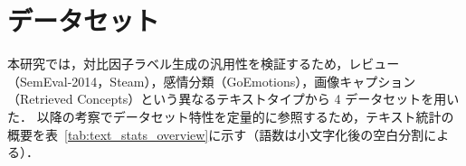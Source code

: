 \section{データセット}
\label{sec:dataset}

本研究では，対比因子ラベル生成の汎用性を検証するため，レビュー（SemEval-2014，Steam），感情分類（GoEmotions），画像キャプション（Retrieved Concepts）という異なるテキストタイプから 4 データセットを用いた．
以降の考察でデータセット特性を定量的に参照するため，テキスト統計の概要を表~\ref{tab:text_stats_overview}に示す（語数は小文字化後の空白分割による）．
\begin{table}[htbp]
  \centering
  \caption{テキスト統計の概要（train/dev/test 合算）}
  \label{tab:text_stats_overview}
\end{table}

